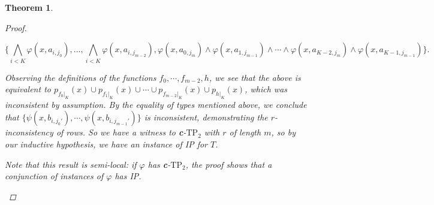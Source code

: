 \documentclass{article}
\newcommand{\TPii}{\text{TP}_2}
\newcommand{\vphi}{\varphi}
\newtheorem{theorem}{Theorem}
\theoremstyle{definition}
\theoremstyle{definition}
\theoremstyle{definition}
\theoremstyle{definition}
\begin{document}
\begin{theorem}
\begin{proof}
\begin{enumerate}
        \[\Biggl\{ \bigwedge_{i<K}\vphi(x,a_{i,j_0}),\dots, \bigwedge_{i<K}\vphi(x,a_{i,j_{m-2}}), \vphi(x,a_{0,j_m})\land\vphi(x,a_{1,j_{m-1}})\land\dotsm\land\vphi(x,a_{K-2,j_m})\land\vphi(x,a_{K-1,j_{m-1}})\Biggr\}.\]
        
        Observing the definitions of the functions $f_0,\dotsm, f_{m-2},h$, we see that the above is equivalent to $p_{f_0|_K}(x)\cup p_{f_1|_K}(x)\cup\dotsm\cup p_{f_{m-2}|_K}(x)\cup p_{h|_K}(x)$, which was inconsistent by assumption. By the equality of types mentioned above, we conclude that $\{\psi(x,b_{i,j_0'}),\dotsm, \psi(x, b_{i,j_{m-1}'})\}$ is inconsistent, demonstrating the $r$-inconsistency of rows. So we have a witness to \textbf{c}-$\TPii$ with $r$ of length $m$, so by our inductive hypothesis, we have an instance of IP for $T$. 

        Note that this result is semi-local: if $\vphi$ has \textbf{c}-$\TPii$, the proof shows that a conjunction of instances of $\vphi$ has IP.
    \end{enumerate}

    
\end{proof}
\end{theorem}



\end{document}
